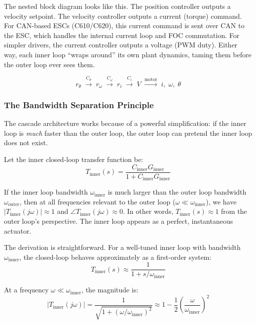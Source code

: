 The nested block diagram looks like this. The position controller outputs a velocity setpoint. The velocity controller outputs a current (torque) command. For CAN-based ESCs (C610/C620), this current command is sent over CAN to the ESC, which handles the internal current loop and FOC commutation. For simpler drivers, the current controller outputs a voltage (PWM duty). Either way, each inner loop ``wraps around'' its own plant dynamics, taming them before the outer loop ever sees them.

\begin{equation}
r_\theta \;\xrightarrow{C_\theta}\; r_\omega \;\xrightarrow{C_\omega}\; r_i \;\xrightarrow{C_i}\; V \;\xrightarrow{\text{motor}}\; i,\;\omega,\;\theta
\end{equation}

\subsubsection{The Bandwidth Separation Principle}

The cascade architecture works because of a powerful simplification: if the inner loop is \textit{much} faster than the outer loop, the outer loop can pretend the inner loop does not exist.

Let the inner closed-loop transfer function be:
\begin{equation}
T_{\text{inner}}(s) = \frac{C_{\text{inner}} G_{\text{inner}}}{1 + C_{\text{inner}} G_{\text{inner}}}
\end{equation}

If the inner loop bandwidth $\omega_{\text{inner}}$ is much larger than the outer loop bandwidth $\omega_{\text{outer}}$, then at all frequencies relevant to the outer loop ($\omega \ll \omega_{\text{inner}}$), we have $|T_{\text{inner}}(j\omega)| \approx 1$ and $\angle T_{\text{inner}}(j\omega) \approx 0$. In other words, $T_{\text{inner}}(s) \approx 1$ from the outer loop's perspective. The inner loop appears as a perfect, instantaneous actuator.

The derivation is straightforward. For a well-tuned inner loop with bandwidth $\omega_{\text{inner}}$, the closed-loop behaves approximately as a first-order system:
\begin{equation}
T_{\text{inner}}(s) \approx \frac{1}{1 + s/\omega_{\text{inner}}}
\end{equation}

At a frequency $\omega \ll \omega_{\text{inner}}$, the magnitude is:
\[
|T_{\text{inner}}(j\omega)| = \frac{1}{\sqrt{1 + (\omega/\omega_{\text{inner}})^2}} \approx 1 - \frac{1}{2}\left(\frac{\omega}{\omega_{\text{inner}}}\right)^2
\]

